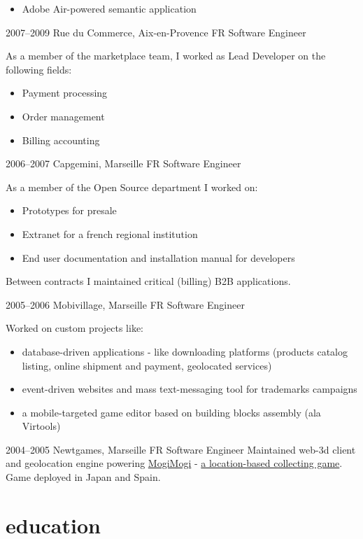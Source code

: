 \documentclass[]{friggeri}
\begin{document}
\begin{entrylist}
{\begin{itemize}
    \item Adobe Air-powered semantic application
    \end{itemize}}
  \entry
    {2007–2009}
    {Rue du Commerce, Aix-en-Provence FR}
    {Software Engineer}
    {As a member of the marketplace team, I worked as Lead Developer on the
    following fields:
    \begin{itemize}
    \item Payment processing
    \item Order management
    \item Billing accounting
    \end{itemize}}
  \entry
    {2006–2007}
    {Capgemini, Marseille FR}
    {Software Engineer}
    {As a member of the Open Source department I worked on:
    \begin{itemize}
    \item Prototypes for presale
    \item Extranet for a french regional institution
    \item End user documentation and installation manual for developers
    \end{itemize}
    Between contracts I maintained critical (billing) B2B applications.}
  \entry
    {2005–2006}
    {Mobivillage, Marseille FR}
    {Software Engineer}
    {Worked on custom projects like:
    \begin{itemize}
    \item database-driven applications - like downloading platforms
    (products catalog listing, online shipment and payment, geolocated services)
    \item event-driven websites and mass text-messaging tool for
    trademarks campaigns
    \item a mobile-targeted game editor based on building blocks
    assembly (ala Virtools)
    \end{itemize}}
  \entry
    {2004–2005}
    {Newtgames, Marseille FR}
    {Software Engineer}
    {Maintained web-3d client and geolocation engine powering
    \href{http://mogimogi.com}{MogiMogi} - \href{https://links.net/share/write/thefeature/Mogi__Second_Generation_Location-Based_Gaming.html}{a location-based collecting game}.
    Game deployed in Japan and Spain.}
\end{entrylist}

\clearpage

\section{education}
\end{document}
